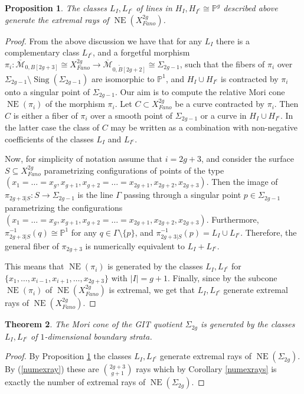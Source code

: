\documentclass[a4paper,10pt]{amsart}
\newtheorem{thm}{Theorem}[section]
\newtheorem{Proposition}[thm]{Proposition}
\theoremstyle{definition}
\newcommand{\cM}{\overline{\mathcal{M}}}
\DeclareMathOperator{\NE}{NE}
\DeclareMathOperator{\Sing}{Sing}
\begin{document}
\begin{Proposition}\label{exray}
The classes $L_I,L_{I^c}$ of lines in $H_I,H_{I^c}\cong\mathbb{P}^g$ described above generate the extremal rays of $\NE(X_{Fano}^{2g})$.
\end{Proposition}
\begin{proof}
From the above discussion we have that for any $L_I$ there is a complementary class $L_{I^c}$, and a forgetful morphism $\pi_i:\cM_{0,B[2g+3]}\cong  X_{Fano}^{2g}\rightarrow \cM_{0,\widetilde{B}[2g+2]}\cong \Sigma_{2g-1}$, such that the fibers of $\pi_i$ over $\Sigma_{2g-1}\setminus \Sing(\Sigma_{2g-1})$ are isomorphic to $\mathbb{P}^1$, and $H_I\cup H_{I^c}$ is contracted by $\pi_i$ onto a singular point of $\Sigma_{2g-1}$. Our aim is to compute the relative Mori cone $\NE(\pi_i) $ of the morphism $\pi_i$. Let $C\subset X_{Fano}^{2g}$ be a curve contracted by $\pi_i$. Then $C$ is either a fiber of $\pi_i$ over a smooth point of $\Sigma_{2g-1}$ or a curve in $H_{I}\cup H_{I^c}$. In the latter case the class of $C$ may be written as a combination with non-negative coefficients of the classes $L_I$ and $L_{I^c}$. 

Now, for simplicity of notation assume that $i = 2g+3$, and consider the surface $S\subseteq X_{Fano}^{2g}$ parametrizing configurations of points of the type $(x_1=\dots=x_g,x_{g+1},x_{g+2}=\dots=x_{2g+1},x_{2g+2},x_{2g+3})$. Then the image of $\pi_{2g+3|S}:S\rightarrow \Sigma_{2g-1}$ is the line $\Gamma$ passing through a singular point $p\in \Sigma_{2g-1}$ parametrizing the configurations $(x_1=\dots=x_g,x_{g+1},x_{g+2}=\dots=x_{2g+1},x_{2g+2},x_{2g+3})$. Furthermore, $\pi_{2g+3|S}^{-1}(q)\cong \mathbb{P}^1$ for any $q\in \Gamma\setminus\{p\}$, and $\pi_{2g+3|S}^{-1}(p)= L_I\cup L_{I^c}$. Therefore, the general fiber of $\pi_{2g+3}$ is numerically equivalent to $L_I + L_{I^c}$.

This means that $\NE(\pi_i)$ is generated by the classes $L_I,L_{I^c}$ for $\{x_1,\dots,x_{i-1},x_{i+1},\dots,x_{2g+3}\}$ with $|I| = g+1$. Finally, since by \cite[Proposition 1.14]{De01} the subcone $\NE(\pi_i)$ of $\NE(X_{Fano}^{2g})$ is extremal, we get that $L_I,L_{I^c}$ generate extremal rays of $\NE(X_{Fano}^{2g})$.
\end{proof}

\begin{thm}\label{ful}
The Mori cone of the GIT quotient $\Sigma_{2g}$ is generated by the classes $L_I,L_{I^c}$ of $1$-dimensional boundary strata.
\end{thm}
\begin{proof}
By Proposition \ref{exray} the classes $L_I,L_{I^c}$ generate extremal rays of $\NE(\Sigma_{2g})$. By (\ref{numexray}) these are $\binom{2g+3}{g+1}$ rays which by Corollary \ref{numexrays} is exactly the number of extremal rays of $\NE(\Sigma_{2g})$.
\end{proof}
\end{document}
